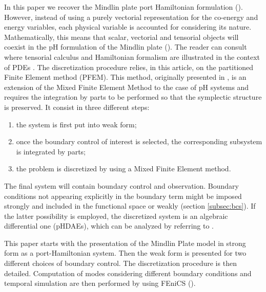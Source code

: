\documentclass{ifacconf}
\begin{document}
In this paper we recover the Mindlin plate port Hamiltonian formulation (\cite{MacchelliMindlin}). However, instead of using a purely vectorial representation for the co-energy and energy variables, each physical variable is accounted for considering its nature. Mathematically, this means that scalar, vectorial and tensorial objects will coexist in the pH formulation of the Mindlin plate (\cite{BrugnoliMin}). The reader can consult \cite[Chapter~16]{Grinfield} where tensorial calculus and Hamiltonian formalism are illustrated in the context of PDEs . The discretization procedure relies, in this article, on the partitioned Finite Element method (PFEM).  This method, originally presented in \cite{CardosoRibeiro2018}, is an extension of the Mixed Finite Element Method to the case of pH systems and requires the integration by parts to be performed so that the symplectic structure is preserved. It consist in three different steps:
\begin{enumerate}
\item the system is first put into weak form;
\item once the boundary control of interest is selected, the corresponding subsystem is integrated by parts;
\item the problem is discretized by using a Mixed Finite Element method.  
\end{enumerate}
The final system will contain boundary control and observation. Boundary conditions not appearing explicitly in the boundary term might be imposed strongly and included in the functional space or weakly (section \ref{subsec:bcs}). If the latter possibility is employed, the discretized system is an algebraic differential one (pHDAEs), which can be analyzed by referring to \cite{beattie2018linear,vanderSchaft2013}. 
 
This paper starts with the presentation of the Mindlin Plate model in strong form as a port-Hamiltonian system. Then the weak form is presented for two different choices of boundary control. The discretization procedure is then detailed. Computation of modes considering different boundary conditions and temporal simulation are then performed by using FEniCS (\cite{LoggMardalEtAl2012}).
\end{document}
